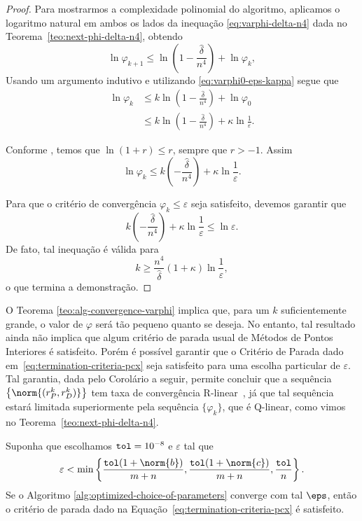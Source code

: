 \begin{proof} Para mostrarmos a complexidade polinomial do algoritmo, aplicamos o logaritmo natural em ambos os lados da inequação \eqref{eq:varphi-delta-n4} dada no Teorema~\ref{teo:next-phi-delta-n4}, obtendo
	\[
	\ln\varphi_{k+1}\leq \ln \left(1 - \frac{\hat{\delta}}{n^{4}}\right) + \ln\varphi_{k},
	\]
Usando um argumento indutivo e utilizando \eqref{eq:varphi0-eps-kappa} segue que
\[
	\begin{aligned}
		\ln\varphi_{k} & \leq k \ln\left(1 - \frac{\hat{\delta}}{n^{4}}\right) + \ln \varphi_{0} \\
					& \leq k \ln\left(1 - \frac{\hat{\delta}}{n^{4}}\right) + \kappa\ln \frac{1}{\varepsilon}. 
	\end{aligned}
\] 

Conforme \textcite[Lema 4.1, p.~68]{Wright:Primal-dual-interior-point:1997h}, temos que $\ln(1+r) \leq r$, sempre que $r>-1$. Assim
\[
	\ln\varphi_{k}\leq k \left(- \frac{\hat{\delta}}{n^{4}}\right) + \kappa\ln \frac{1}{\varepsilon}.
\] 

Para que o critério de convergência $\varphi_{k}\leq\varepsilon$ seja satisfeito, devemos garantir que 
\[
	k \left(- \frac{\hat{\delta}}{n^{4}}\right) + \kappa\ln \frac{1}{\varepsilon} \leq \ln\varepsilon.
\] 
De fato, tal inequação é válida para 
\[
	k \geq \dfrac{n^{4}}{\hat{\delta}}(1+\kappa)\ln\frac{1}{\varepsilon},
\]
o que termina a demonstração.
\end{proof}






O Teorema \ref{teo:alg-convergence-varphi} implica que, para um $k$ suficientemente grande, o valor de $\varphi$ será tão pequeno quanto se deseja. No entanto, tal resultado ainda não implica que algum critério de parada usual de Métodos de Pontos Interiores é satisfeito. Porém é possível garantir que o Critério de Parada dado em~\eqref{eq:termination-criteria-pcx} seja satisfeito para uma escolha particular de $\varepsilon$. Tal garantia, dada pelo Corolário a seguir, permite concluir que a sequência $\left\{\norm{(r_{P}^{k},r_{D}^{k})}\right\}$ tem taxa de convergência R-linear~\cite{Ortega:2000vd}, já que tal sequência estará limitada superiormente pela sequência $\{\varphi_{k}\}$, que é Q-linear, como vimos no Teorema~\ref{teo:next-phi-delta-n4}.

\begin{corol}
Suponha que escolhamos  $\mathtt{tol} = \num{e-8}$  e $\varepsilon$   tal que 
\begin{equation}
	\label{eq:choosing-eps}
		\varepsilon < \min\left\{  \frac{\tol(1+\norm{b})}{m+n}, \frac{\tol(1+\norm{c})}{m+n},\frac{\tol}{n}\right\}.
\end{equation}
Se o Algoritmo \ref{alg:optimized-choice-of-parameters} converge com tal $\eps$, então o critério de parada dado na Equação~\eqref{eq:termination-criteria-pcx} é satisfeito.
\end{corol}		

